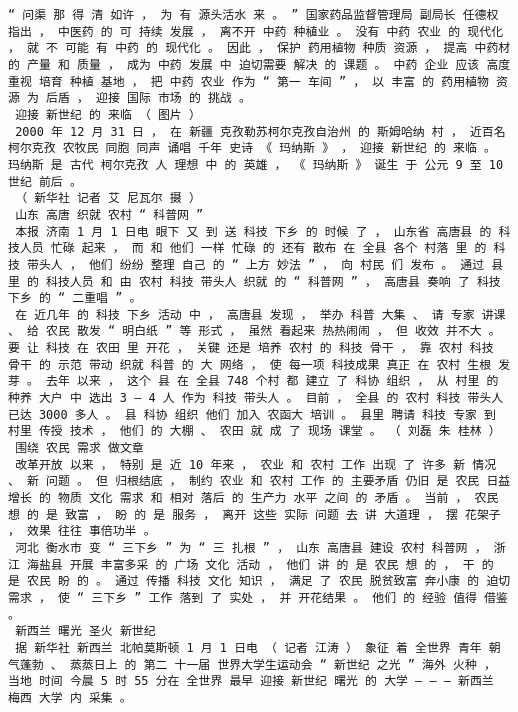 \documentclass{article}
\begin{document}
\begin{Verbatim}[commandchars=\\\{\}]
 “ 问渠 那 得 清 如许 ， 为 有 源头活水 来 。 ” 国家药品监督管理局 副局长 任德权 指出 ， 中医药 的 可 持续 发展 ， 离不开 中药 种植业 。 没有 中药 农业 的 现代化 ， 就 不 可能 有 中药 的 现代化 。 因此 ， 保护 药用植物 种质 资源 ， 提高 中药材 的 产量 和 质量 ， 成为 中药 发展 中 迫切需要 解决 的 课题 。 中药 企业 应该 高度重视 培育 种植 基地 ， 把 中药 农业 作为 “ 第一 车间 ” ， 以 丰富 的 药用植物 资源 为 后盾 ， 迎接 国际 市场 的 挑战 。 
 迎接 新世纪 的 来临 （ 图片 ） 
 2000 年 12 月 31 日 ， 在 新疆 克孜勒苏柯尔克孜自治州 的 斯姆哈纳 村 ， 近百名 柯尔克孜 农牧民 同胞 同声 诵唱 千年 史诗 《 玛纳斯 》 ， 迎接 新世纪 的 来临 。 玛纳斯 是 古代 柯尔克孜 人 理想 中 的 英雄 ， 《 玛纳斯 》 诞生 于 公元 9 至 10 世纪 前后 。 
 （ 新华社 记者 艾 尼瓦尔 摄 ） 
 山东 高唐 织就 农村 “ 科普网 ” 
 本报 济南 1 月 1 日电 眼下 又 到 送 科技 下乡 的 时候 了 ， 山东省 高唐县 的 科技人员 忙碌 起来 ， 而 和 他们 一样 忙碌 的 还有 散布 在 全县 各个 村落 里 的 科技 带头人 ， 他们 纷纷 整理 自己 的 “ 上方 妙法 ” ， 向 村民 们 发布 。 通过 县里 的 科技人员 和 由 农村 科技 带头人 织就 的 “ 科普网 ” ， 高唐县 奏响 了 科技 下乡 的 “ 二重唱 ” 。 
 在 近几年 的 科技 下乡 活动 中 ， 高唐县 发现 ， 举办 科普 大集 、 请 专家 讲课 、 给 农民 散发 “ 明白纸 ” 等 形式 ， 虽然 看起来 热热闹闹 ， 但 收效 并不大 。 要 让 科技 在 农田 里 开花 ， 关键 还是 培养 农村 的 科技 骨干 ， 靠 农村 科技 骨干 的 示范 带动 织就 科普 的 大 网络 ， 使 每一项 科技成果 真正 在 农村 生根 发芽 。 去年 以来 ， 这个 县 在 全县 748 个村 都 建立 了 科协 组织 ， 从 村里 的 种养 大户 中 选出 3 — 4 人 作为 科技 带头人 。 目前 ， 全县 的 农村 科技 带头人 已达 3000 多人 。 县 科协 组织 他们 加入 农函大 培训 。 县里 聘请 科技 专家 到 村里 传授 技术 ， 他们 的 大棚 、 农田 就 成 了 现场 课堂 。 （ 刘磊 朱 桂林 ） 
 围绕 农民 需求 做文章 
 改革开放 以来 ， 特别 是 近 10 年来 ， 农业 和 农村 工作 出现 了 许多 新 情况 、 新 问题 。 但 归根结底 ， 制约 农业 和 农村 工作 的 主要矛盾 仍旧 是 农民 日益增长 的 物质 文化 需求 和 相对 落后 的 生产力 水平 之间 的 矛盾 。 当前 ， 农民 想 的 是 致富 ， 盼 的 是 服务 ， 离开 这些 实际 问题 去 讲 大道理 ， 摆 花架子 ， 效果 往往 事倍功半 。 
 河北 衡水市 变 “ 三下乡 ” 为 “ 三 扎根 ” ， 山东 高唐县 建设 农村 科普网 ， 浙江 海盐县 开展 丰富多采 的 广场 文化 活动 ， 他们 讲 的 是 农民 想 的 ， 干 的 是 农民 盼 的 。 通过 传播 科技 文化 知识 ， 满足 了 农民 脱贫致富 奔小康 的 迫切 需求 ， 使 “ 三下乡 ” 工作 落到 了 实处 ， 并 开花结果 。 他们 的 经验 值得 借鉴 。 
 新西兰 曙光 圣火 新世纪 
 据 新华社 新西兰 北帕莫斯顿 1 月 1 日电 （ 记者 江涛 ） 象征 着 全世界 青年 朝气蓬勃 、 蒸蒸日上 的 第二 十一届 世界大学生运动会 “ 新世纪 之光 ” 海外 火种 ， 当地 时间 今晨 5 时 55 分在 全世界 最早 迎接 新世纪 曙光 的 大学 — — — 新西兰 梅西 大学 内 采集 。 

\end{Verbatim}
\end{document}
